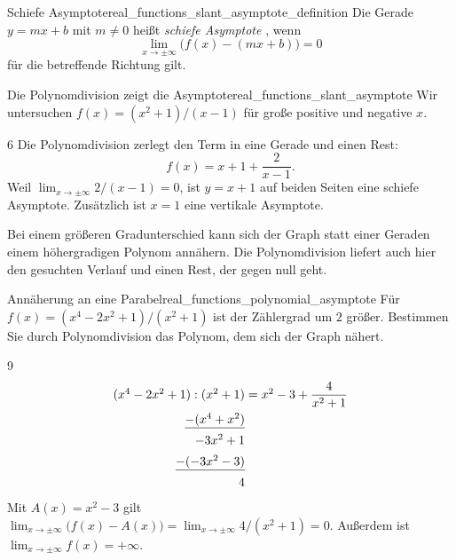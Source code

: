 \par\noindent\begin{minipage}{\linewidth}
\begin{DefinitionBox}{Schiefe Asymptote}{real_functions_slant_asymptote_definition}
  Die Gerade $y=mx+b$ mit $m\ne0$ heißt \emph{schiefe Asymptote}
  , wenn
  \[
    \lim_{x\to\pm\infty}\bigl(f(x)-(mx+b)\bigr)=0
  \]
  für die betreffende Richtung gilt.
\end{DefinitionBox}
\begin{ExampleBox}[before skip=0.3\baselineskip]{Die Polynomdivision zeigt die Asymptote}{real_functions_slant_asymptote}
  Wir untersuchen $f(x)=(x^2+1)/(x-1)$ für große positive und negative $x$.
  \begin{ClozeArea}[34]{6}
    Die Polynomdivision zerlegt den Term in eine Gerade und einen Rest:
    \[
      f(x)=x+1+\frac2{x-1}.
    \]
    Weil $\lim_{x\to\pm\infty}2/(x-1)=0$, ist $y=x+1$
    auf beiden Seiten eine schiefe Asymptote.
    Zusätzlich ist $x=1$ eine \textcolor{green!55!black}{vertikale Asymptote}.
  \end{ClozeArea}
  \begin{center}
  \end{center}
\end{ExampleBox}
\end{minipage}

Bei einem größeren Gradunterschied kann sich der Graph statt einer Geraden
einem höhergradigen Polynom annähern. Die Polynomdivision liefert auch hier
den gesuchten Verlauf und einen Rest, der gegen null geht.

\begin{ExampleBox}{Annäherung an eine Parabel}{real_functions_polynomial_asymptote}
  Für $f(x)=(x^4-2x^2+1)/(x^2+1)$ ist der Zählergrad um $2$ größer.
  Bestimmen Sie durch Polynomdivision das Polynom, dem sich der Graph nähert.
  \begin{ClozeArea}[34]{9}
    \[
      \begin{array}{r@{\;}l}
        (x^4-2x^2+1):(x^2+1)&=x^2-3+\dfrac4{x^2+1}\\[0.8em]
        \underline{-(x^4+x^2)}&\\[0.5em]
        -3x^2+1&\\[0.5em]
        \underline{-(-3x^2-3)}&\\[0.5em]
        4&
      \end{array}
    \]
    Mit $A(x)=x^2-3$ gilt
    $\lim_{x\to\pm\infty}\bigl(f(x)-A(x)\bigr)=
      \lim_{x\to\pm\infty}4/(x^2+1)=0$.
    Außerdem ist $\lim_{x\to\pm\infty}f(x)=+\infty$.
  \end{ClozeArea}
  \begin{center}
  \end{center}
\end{ExampleBox}

